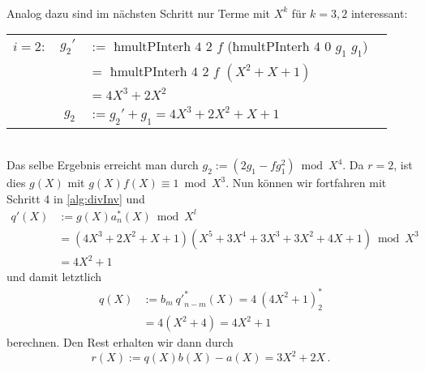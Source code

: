 \begin{beispiel}
\begin{tabular}{lrll}
  \end{tabular}\\
  Analog dazu sind im nächsten Schritt nur Terme mit $X^k$ für 
  $k=3,2$ interessant:\\
  \begin{tabular}{lrll}
    $i=2:$ & $g_2'$&$:=$ ħmultPInterħ $4$ $2$ $f$ (ħmultPInterħ $4$ $0$ $g_1$ $g_1$)\\
            &&$=$ ħmultPInterħ $4$ $2$ $f$ $(X^2+X+1)$\\
            &&$= 4X^3+2X^2$\\
        & $g_2$&$:= g_2' + g_1 = 4X^3+2X^2+X+1$
  \end{tabular}\\
  Das selbe Ergebnis erreicht man durch $g_2 := (2g_1 - fg_1^2) \bmod X^4$.
  Da $r=2$, ist dies $g(X)$ mit $g(X)f(X) \equiv 1 \bmod X^3$.
  Nun können wir fortfahren mit Schritt 4 in \autoref{alg:divInv} und 
  \begin{align*}
    q'(X) &:= g(X) a^\ast_n(X) \bmod X^l\\
    &= (4X^3+2X^2+X+1)(X^5+3X^4+3X^3 + 3X^2 + 4X + 1) \bmod X^3\\
    &= 4X^2 + 1
  \end{align*}
  und damit letztlich
  \begin{align*}
    q(X) &:= b_m\ {q'}^\ast_{n-m}(X) = 4\ (4X^2+1)^\ast_{2} \\
    &= 4 (X^2 + 4) = 4X^2 + 1
  \end{align*}
  berechnen. Den Rest erhalten wir dann durch 
  \[ r(X) := q(X)b(X) - a(X) = 3X^2 + 2X\,. \]
\end{beispiel}




